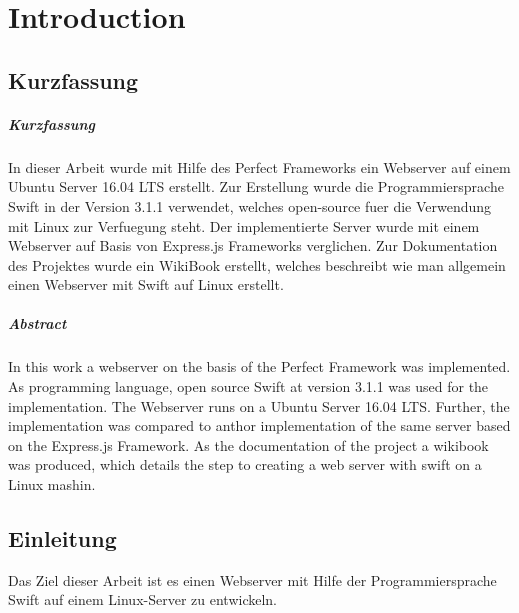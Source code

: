 \chapter{Introduction}\label{chap:introduction}
\chapterstart
\section{Kurzfassung}
\label{section:kurzfassung}
\paragraph{Kurzfassung}
In dieser Arbeit wurde mit Hilfe des Perfect Frameworks ein Webserver auf einem Ubuntu Server 16.04 LTS erstellt. Zur Erstellung wurde die Programmiersprache Swift in der Version 3.1.1 verwendet, welches open-source fuer die Verwendung mit Linux zur Verfuegung steht. Der implementierte Server wurde mit einem Webserver auf Basis von Express.js Frameworks verglichen. Zur Dokumentation des Projektes wurde ein WikiBook erstellt, welches beschreibt wie man allgemein einen Webserver mit Swift auf Linux erstellt.
\paragraph{Abstract}
In this work a webserver on the basis of the Perfect Framework was implemented. As programming language, open source Swift at version 3.1.1 was used for the implementation. The Webserver runs on a Ubuntu Server 16.04 LTS. Further, the implementation was compared to anthor implementation of the same server based on the Express.js Framework. As the documentation of the project a wikibook was produced, which details the step to creating a web server with swift on a Linux mashin. 
\section{Einleitung}
\label{sec:einleitung}
Das Ziel dieser Arbeit ist es einen Webserver mit Hilfe der Programmiersprache Swift auf einem Linux-Server zu entwickeln. 
